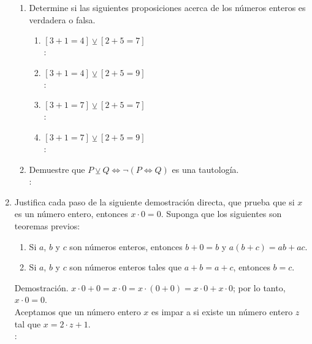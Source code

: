 \begin{enumerate}[label=0.1.\arabic*]
\begin{enumerate}[label=\arabic*)]
		\item Determine si las siguientes proposiciones acerca de los números enteros es verdadera o falsa.
		\begin{enumerate}[label=\roman*)]
			\item $ [3+1=4] \veebar [2+5=7] $ \\
			\solucion: \\
			
			\item $ [3+1=4] \veebar [2+5=9] $ \\
			\solucion: \\
			
			\item $ [3+1=7] \veebar [2+5=7] $ \\
			\solucion: \\
			
			\item $ [3+1=7] \veebar [2+5=9] $ \\
			\solucion: \\
		\end{enumerate}
	
		\item Demuestre que $ P \veebar Q \Leftrightarrow \neg (P \Leftrightarrow Q) $ es una tautología. \\
		\solucion: \\
		
	\end{enumerate}

	\item Justifica cada paso de la siguiente demostración directa, que prueba que si $ x $ es un número entero, entonces $ x \cdot 0  = 0 $. Suponga que los siguientes son teoremas previos:
	\begin{enumerate}[label=\arabic*)]
		\item Si $ a $, $ b $ y $ c $ son números enteros, entonces $ b + 0 = b $ y $ a(b+c) = ab + ac $.
		\item Si $ a $, $ b $ y $ c $ son números enteros tales que $ a + b = a + c $, entonces $ b = c $.
	\end{enumerate}

	Demostración. $ x \cdot 0 + 0 = x \cdot 0 = x \cdot (0+0) = x \cdot 0 + x \cdot 0 $; por lo tanto, $ x \cdot 0 = 0 $. \\
	Aceptamos que un número entero $ x $ es impar a si existe un número entero $ z $ tal que $ x = 2 \cdot z + 1 $. \\
	\solucion: \\
	

\end{enumerate}

